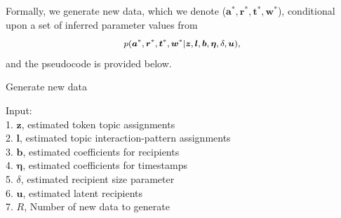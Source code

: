\documentclass[twoside]{article}
\begin{document}
     Formally, we generate new data, which we denote ($\boldsymbol{a}^*, \boldsymbol{r}^*, \boldsymbol{t}^*, \boldsymbol{w}^*$), conditional upon a set of inferred parameter values from
     \begin{equation*}
       	 \footnotesize
 p(\boldsymbol{a}^*, \boldsymbol{r}^*, \boldsymbol{t}^*, \boldsymbol{w}^* |\boldsymbol{z},  \boldsymbol{l}, \boldsymbol{b}, \boldsymbol{\eta}, \delta, \boldsymbol{u}),
     \label{eqn:PPC}
     \end{equation*}
     and the pseudocode is provided below.  
     \begin{algorithm}[ht]
     	\footnotesize
     	\SetAlgoLined
     	\caption{Generate new data}
     	Input:\\
     	1. $\boldsymbol{z}$, estimated token topic assignments\\
     	2. $\boldsymbol{l}$, estimated topic interaction-pattern assignments\\
     	3. $\boldsymbol{b}$,  estimated coefficients for recipients \\
     	4. $\boldsymbol{\eta}$,  estimated coefficients for timestamps\\
     	5. $\delta$, estimated recipient size parameter\\
     	6. $\boldsymbol{u}$, estimated latent recipients \\
     	7. $R$, Number of new data to generate\\
     	
     	 {
         }		
     \end{algorithm}        
  	  
\end{document}
